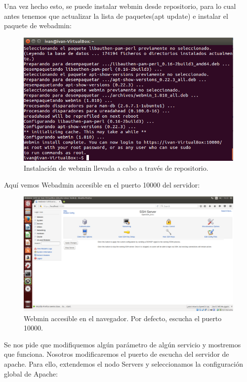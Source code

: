 \begin{itemize}
	
	Una vez hecho esto, se puede instalar webmin desde repositorio, para lo cual antes tenemos que actualizar la lista de paquetes(apt update) e instalar el paquete de webadmin:\\
	
	\begin{figure}[H]
		\centering
		\includegraphics[width=0.7\linewidth]{WebminInstalled}
		\caption[Webmin Instalado]{Instalación de webmin llevada a cabo a través de repositorio.}
		\label{fig:WebminInstalled}
	\end{figure}
	
	Aquí vemos Webadmin accesible en el puerto 10000 del servidor:\\
	
	\begin{figure}[H]
		\centering
		\includegraphics[width=0.7\linewidth]{WebminAccesible}
		\caption[Webmin accesible]{Webmin accesible en el navegador. Por defecto, escucha el puerto 10000.}
		\label{fig:WebminAccesible}
	\end{figure}

	Se nos pide que modifiquemos algún parámetro de algún servicio y mostremos que funciona. Nosotros modificaremos el puerto de escucha del servidor de apache. Para ello, extendemos el nodo Servers y seleccionamos la configuración global de Apache:\\
	

\end{itemize}
